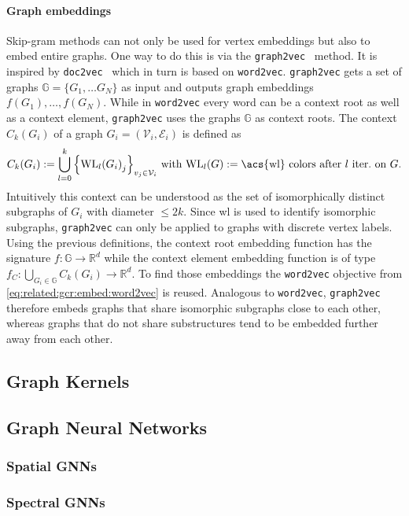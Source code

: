 \paragraph{Graph embeddings}
Skip-gram methods can not only be used for vertex embeddings but also to embed entire graphs.
One way to do this is via the \texttt{graph2vec}~\cite{Narayanan2017} method.
It is inspired by \texttt{doc2vec}~\cite{Le2014} which in turn is based on \texttt{word2vec}.
\texttt{graph2vec} gets a set of graphs $\mathbb{G} = \{ G_1, \dots G_N \}$ as input and outputs graph embeddings $f(G_1), \dots, f(G_N)$.
While in \texttt{word2vec} every word can be a context root as well as a context element, \texttt{graph2vec} uses the graphs $\mathbb{G}$ as context roots.
The context $C_k(G_i)$ of a graph $G_i = (\mathcal{V}_i, \mathcal{E}_i)$ is defined as
\begin{equation}
	C_k(G_i) := \bigcup_{l = 0}^k {\left\{ {\textrm{WL}_l(G_i)}_j \right\}}_{v_j \in \mathcal{V}_i} %
	\text{ with } \textrm{WL}_l(G) := \text{\acs{wl} colors after $l$ iter.\ on $G$.}
\end{equation}
Intuitively this context can be understood as the set of isomorphically distinct subgraphs of $G_i$ with diameter $\leq 2k$.
Since \ac{wl} is used to identify isomorphic subgraphs, \texttt{graph2vec} can only be applied to graphs with discrete vertex labels.
Using the previous definitions, the context root embedding function has the signature $f: \mathbb{G} \to \mathbb{R}^d$ while the context element embedding function is of type $f_C: \bigcup_{G_i \in \mathbb{G}} C_k(G_i) \to \mathbb{R}^d$.
To find those embeddings the \texttt{word2vec} objective from \cref{eq:related:gcr:embed:word2vec} is reused.
Analogous to \texttt{word2vec}, \texttt{graph2vec} therefore embeds graphs that share isomorphic subgraphs close to each other, whereas graphs that do not share substructures tend to be embedded further away from each other.

\subsection{Graph Kernels}%
\label{sec:related:gcr:kernel}

\subsection{Graph Neural Networks}%
\label{sec:related:gcr:nn}

\subsubsection{Spatial GNNs}

\subsubsection{Spectral GNNs}
